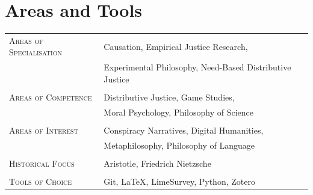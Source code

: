 \documentclass[a4paper,10pt]{article}
\begin{document}
\section{Areas and Tools}
\begin{longtable}{p{4cm}p{11.5cm}}
   \textsc{Areas of Specialisation}   & Causation, Empirical Justice Research,                     \\
                                      & Experimental Philosophy, Need-Based Distributive Justice   \\
                                      &                                                            \\
   \textsc{Areas of Competence}       & Distributive Justice, Game Studies,                        \\
                                      & Moral Psychology, Philosophy of Science                    \\
                                      &                                                            \\
   \textsc{Areas of Interest}         & Conspiracy Narratives, Digital Humanities,                 \\
                                      & Metaphilosophy, Philosophy of Language                     \\
                                      &                                                            \\
   \textsc{Historical Focus}          & Aristotle, Friedrich Nietzsche                             \\
                                      &                                                            \\
   \textsc{Tools of Choice}           & Git, \LaTeX, LimeSurvey, Python, Zotero                    \\
\end{longtable}


\clearpage
\end{document}
